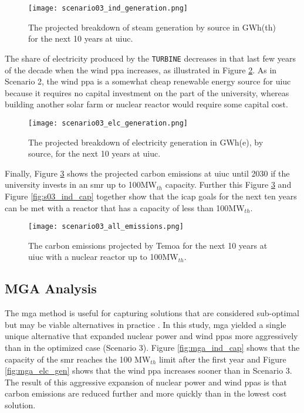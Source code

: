 \begin{figure}[ht!]
	\centering
	\texttt{[image: scenario03\_ind\_generation.png]}
	\caption{The projected breakdown of steam generation by source in GWh(th)
	for the next 10 years at \gls{uiuc}.}
	\label{fig:s03_ind_gen}
\end{figure}
The share of electricity produced by the \texttt{TURBINE} decreases in
that last few years of the decade when the wind \gls{ppa} increases, as
illustrated in Figure \ref{fig:s03_elc_gen}. As in Scenario 2, the wind
\gls{ppa} is a somewhat cheap renewable energy source for \gls{uiuc} because
it requires no capital investment on the part of the university, whereas
building another solar farm or nuclear reactor would require some capital cost.

\begin{figure}[ht!]
	\centering
	\texttt{[image: scenario03\_elc\_generation.png]}
	\caption{The projected breakdown of electricity generation in GWh(e), by
	source, for the next 10 years at \gls{uiuc}.}
	\label{fig:s03_elc_gen}
\end{figure}

Finally, Figure \ref{fig:s03_all_co2} shows the projected carbon emissions at
\gls{uiuc} until 2030 if the university invests in an \gls{smr} up to
100MW$_{th}$ capacity. Further this Figure \ref{fig:s03_all_co2} and Figure
\ref{fig:s03_ind_cap} together show that the \gls{icap} goals for the next ten
years can be met with a reactor that has a capacity of less than 100MW$_{th}$.

\begin{figure}[ht!]
	\centering
	\texttt{[image: scenario03\_all\_emissions.png]}
	\caption{The carbon emissions projected by Temoa for the next 10 years at
	\gls{uiuc} with a nuclear reactor up to 100MW$_{th}$.}
	\label{fig:s03_all_co2}
\end{figure}

\subsection{MGA Analysis}

The \gls{mga} method is useful for capturing solutions that are
considered sub-optimal but may be viable alternatives in practice
\cite{decarolis_modelling_2016, hunter_modeling_2013,decarolis_using_2011}.
In this study, \gls{mga} yielded a single unique alternative that expanded
nuclear power and wind \glspl{ppa} more aggressively than in the optimized case
(Scenario 3). Figure \ref{fig:mga_ind_cap} shows that the capacity of the
\gls{smr} reaches the 100 MW$_{th}$ limit after the first year and Figure
\ref{fig:mga_elc_gen} shows that the wind \gls{ppa} increases sooner than in
Scenario 3. The result of this aggressive expansion of nuclear power and wind
\glspl{ppa} is that carbon emissions are reduced further and more quickly than
in the lowest cost solution.

